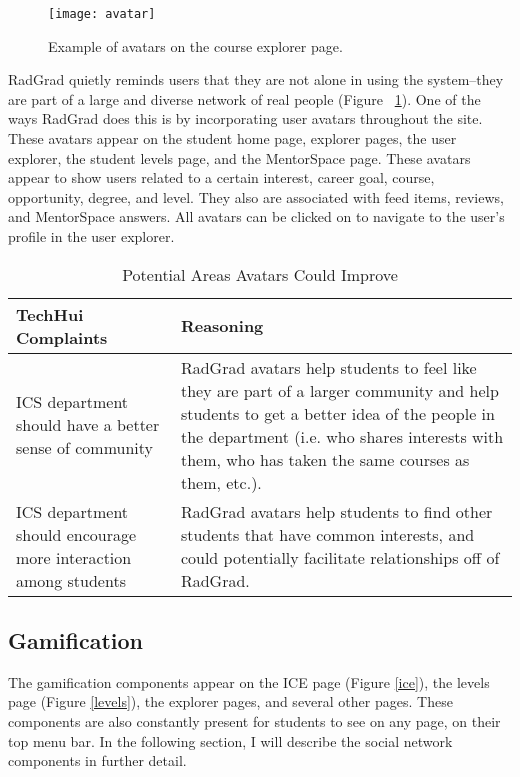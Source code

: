 \begin{figure}[htbp!]
\centering
\texttt{[image: avatar]}
\caption{Example of avatars on the course explorer page.}
\label{course-explorer-avatars}
\end{figure}
RadGrad quietly reminds users that they are not alone in using the system--they are part of a large and diverse network of real people (Figure ~\ref{course-explorer-avatars}). One of the ways RadGrad does this is by incorporating user avatars throughout the site. These avatars appear on the student home page, explorer pages, the user explorer, the student levels page, and the MentorSpace page. These avatars appear to show users related to a certain interest, career goal, course, opportunity, degree, and level. They also are associated with feed items, reviews, and MentorSpace answers. All avatars can be clicked on to navigate to the user's profile in the user explorer.  

\begin{table}[htbp!]
\centering
 \caption{Potential Areas Avatars Could Improve}
\begin{tabular}{  |p{4cm}|p{12cm}| } 
\hline
 \textbf{TechHui Complaints} & \textbf{Reasoning} \\ 
  \hline
ICS department should have a better sense of community & RadGrad avatars help students to feel like they are part of a larger community and help students to get a better idea of the people in the department (i.e. who shares interests with them, who has taken the same courses as them, etc.). \\
\hline
ICS department should encourage more interaction among students & RadGrad avatars help students to find other students that have common interests, and could potentially facilitate relationships off of RadGrad.\\
\hline
\end{tabular}
\end{table}


\subsection{Gamification}

The gamification components appear on the ICE page (Figure \ref{ice}), the levels page (Figure \ref{levels}), the explorer pages, and several other pages. These components are also constantly present for students to see on any page, on their top menu bar. In the following section, I will describe the social network components in further detail. 
